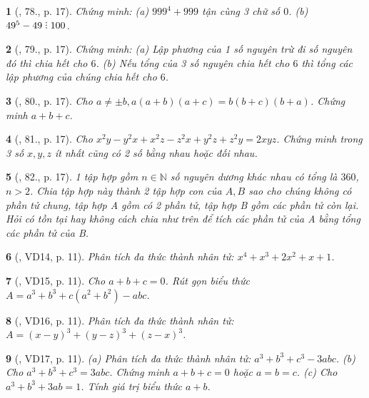 \documentclass{article}
\newtheorem{baitoan}{}
\DeclareRobustCommand{\divby}{%
	\mathrel{\vbox{\baselineskip.65ex\lineskiplimit0pt\hbox{.}\hbox{.}\hbox{.}}}%
}
\begin{document}
\begin{baitoan}[\cite{Tuyen_Toan_8}, 78., p. 17]
	Chứng minh: (a) $999^4 + 999$ tận cùng 3 chữ số $0$. (b) $49^5 - 49\divby100$.
\end{baitoan}

\begin{baitoan}[\cite{Tuyen_Toan_8}, 79., p. 17]
	Chứng minh: (a) Lập phương của 1 số nguyên trừ đi số nguyên đó thì chia hết cho $6$. (b) Nếu tổng của 3 số nguyên chia hết cho $6$ thì tổng các lập phương của chúng chia hết cho $6$.
\end{baitoan}

\begin{baitoan}[\cite{Tuyen_Toan_8}, 80., p. 17]
	Cho $a\ne\pm b,a(a + b)(a + c) = b(b + c)(b + a)$. Chứng minh $a + b + c$.
\end{baitoan}

\begin{baitoan}[\cite{Tuyen_Toan_8}, 81., p. 17]
	Cho $x^2y - y^2x + x^2z - z^2x + y^2z + z^2y = 2xyz$. Chứng minh trong 3 số $x,y,z$ ít nhất cũng có 2 số bằng nhau hoặc đối nhau.
\end{baitoan}

\begin{baitoan}[\cite{Tuyen_Toan_8}, 82., p. 17]
	1 tập hợp gồm $n\in\mathbb{N}$ số nguyên dương khác nhau có tổng là $360$, $n > 2$. Chia tập hợp này thành 2 tập hợp con của $A,B$ sao cho chúng không có phần tử chung, tập hợp A gồm có 2 phần tử, tập hợp B gồm các phần tử còn lại. Hỏi có tồn tại hay không cách chia như trên để tích các phần tử của A bằng tổng các phần tử của B.
\end{baitoan}

\begin{baitoan}[\cite{Binh_Toan_8_tap_1}, VD14, p. 11]
	Phân tích đa thức thành nhân tử: $x^4 + x^3 + 2x^2 + x + 1$.
\end{baitoan}

\begin{baitoan}[\cite{Binh_Toan_8_tap_1}, VD15, p. 11]
	Cho $a + b + c = 0$. Rút gọn biểu thức $A = a^3 + b^3 + c(a^2 + b^2) - abc$.
\end{baitoan}

\begin{baitoan}[\cite{Binh_Toan_8_tap_1}, VD16, p. 11]
	Phân tích đa thức thành nhân tử: $A = (x - y)^3 + (y - z)^3 + (z - x)^3$.
\end{baitoan}

\begin{baitoan}[\cite{Binh_Toan_8_tap_1}, VD17, p. 11]
	(a) Phân tích đa thức thành nhân tử: $a^3 + b^3 + c^3 - 3abc$. (b) Cho $a^3 + b^3 + c^3 = 3abc$. Chứng minh $a + b + c = 0$ hoặc $a = b = c$. (c) Cho $a^3 + b^3 + 3ab = 1$. Tính giá trị biểu thức $a + b$.
\end{baitoan}
\end{document}
